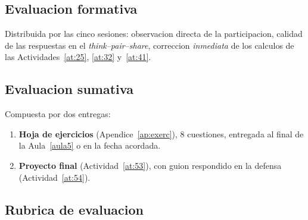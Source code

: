 \documentclass[12pt,a4paper]{scrartcl}
\begin{document}
\subsection{Evaluacion formativa}
Distribuida por las cinco sesiones: observacion directa de la participacion, calidad de las respuestas en el \emph{think--pair--share}, correccion \emph{inmediata} de los calculos de las Actividades~\ref{at:25}, \ref{at:32} y~\ref{at:41}.

\subsection{Evaluacion sumativa}
Compuesta por dos entregas:

\begin{enumerate}[leftmargin=1.5em,itemsep=0.2em,topsep=0.3em,nosep]
  \item \textbf{Hoja de ejercicios} (Apendice~\ref{ap:exerc}), 8 cuestiones, entregada al final de la Aula~\ref{aula5} o en la fecha acordada.
  \item \textbf{Proyecto final} (Actividad~\ref{at:53}), con guion respondido en la defensa (Actividad~\ref{at:54}).
\end{enumerate}

\subsection{Rubrica de evaluacion}
\end{document}
